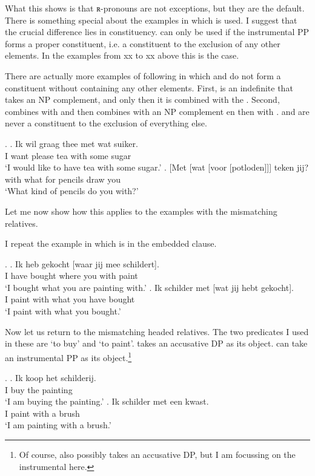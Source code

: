 \documentclass{article}
\begin{document}
What this shows is that ʀ-pronouns are not exceptions, but they are the default. There is something special about the examples in which  is used. I suggest that the crucial difference lies in constituency.  can only be used if the instrumental PP forms a proper constituent, i.e. a constituent to the exclusion of any other elements. In the examples from xx to xx above this is the case.

There are actually more examples of  following  in which  and  do not form a constituent without containing any other elements. First,  is an indefinite that takes an NP complement, and only then it is combined with the . Second,  combines with  and then combines with an NP complement en then with .  and  are never a constituent to the exclusion of everything else.

\ex.
\ag. Ik wil graag thee met wat suiker.\\
 I want please tea with some sugar\\
 `I would like to have tea with some sugar.'
\bg. [Met [wat [voor [potloden]]] teken jij?\\
 with what for pencils draw you\\
 `What kind of pencils do you with?'

Let me now show how this applies to the examples with the mismatching relatives.


I repeat the example in which  is in the embedded clause.

\ex.
\ag. Ik heb gekocht [waar jij mee schildert].\\
 I have bought where you with paint\\
 `I bought what you are painting with.'
\bg. Ik schilder met [wat jij hebt gekocht].\\
 I paint with what you have bought\\
 `I paint with what you bought.'

Now let us return to the mismatching headed relatives. The two predicates I used in these are  `to buy' and   `to paint'.  takes an accusative DP as its object.  can take an instrumental PP as its object.\footnote{Of course,  also possibly takes an accusative DP, but I am focussing on the instrumental here.}

\ex.
\ag. Ik koop het schilderij.\\
 I buy the painting\\
 `I am buying the painting.'
\bg. Ik schilder met een kwast.\\
 I paint with a brush\\
 `I am painting with a brush.'
\end{document}
